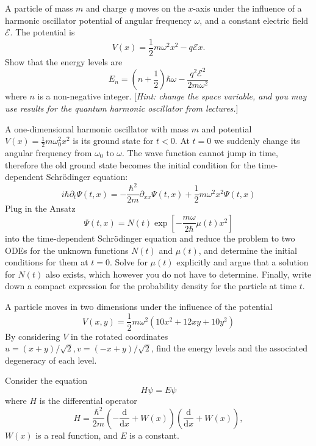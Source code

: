 \documentclass[answers]{exam}
\begin{document}
\begin{questions}
\question%
A particle of mass $m$ and charge $q$ moves on the $x$-axis under the influence of a harmonic oscillator potential of angular frequency $\omega$, and a constant electric field $\mathcal{E}$. The potential is \[
	V(x)=\frac{1}{2} m \omega^{2} x^{2}-q \mathcal{E} x.
\] Show that the energy levels are \[
	E_{n}=\left(n+\frac{1}{2}\right) \hbar \omega-\frac{q^{2} \mathcal{E}^{2}}{2 m \omega^{2}}
\] where $n$ is a non-negative integer. [\emph{Hint: change the space variable, and you may use results for the quantum harmonic oscillator from lectures.}]



\question%
A one-dimensional harmonic oscillator with mass $m$ and potential $V(x)=\frac{1}{2} m \omega_{0}^{2} x^{2}$ is its ground state for $t<0$. At $t=0$ we suddenly change its angular frequency from $\omega_{0}$ to $\omega$. The wave function cannot jump in time, therefore the old ground state becomes the initial condition for the time-dependent Schrödinger equation: \[
	i \hbar \partial_{t} \Psi(t, x)=-\frac{\hbar^{2}}{2 m} \partial_{x x} \Psi(t, x)+\frac{1}{2} m \omega^{2} x^{2} \Psi(t, x)
\] Plug in the Ansatz \[
	\Psi(t, x)=N(t) \exp \left[-\frac{m \omega}{2 \hbar} \mu(t) x^{2}\right]
\] into the time-dependent Schrödinger equation and reduce the problem to two ODEs for the unknown functions $N(t)$ and $\mu(t)$, and determine the initial conditions for them at $t=0$. Solve for $\mu(t)$ explicitly and argue that a solution for $N(t)$ also exists, which however you do not have to determine. Finally, write down a compact expression for the probability density for the particle at time $t$.



\question%
A particle moves in two dimensions under the influence of the potential \[
	V(x, y)=\frac{1}{2} m \omega^{2}\left(10 x^{2}+12 x y+10 y^{2}\right)
\] By considering $V$ in the rotated coordinates $u=(x+y) / \sqrt{2}, v=(-x+y) / \sqrt{2}$, find the energy levels and the associated degeneracy of each level.



\question%
Consider the equation \[
	H \psi=E \psi
\] where $H$ is the differential operator \[
	H=\frac{\hbar^{2}}{2 m}\left(-\frac{\mathrm{d}}{\mathrm{d} x}+W(x)\right)\left(\frac{\mathrm{d}}{\mathrm{d} x}+W(x)\right),
\] $W(x)$ is a real function, and $E$ is a constant.
\end{questions}
\end{document}
